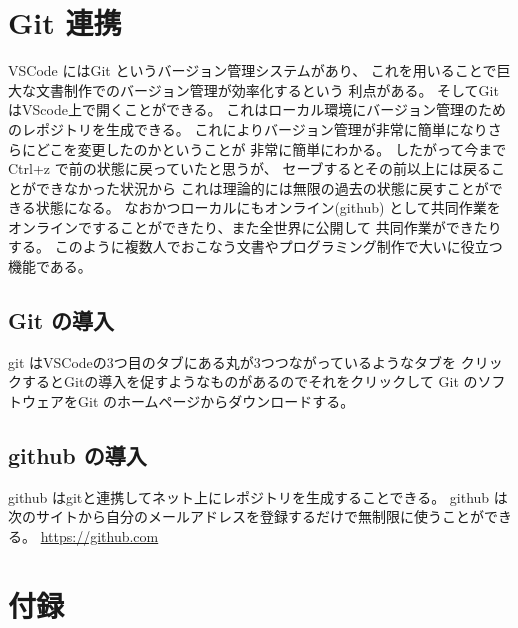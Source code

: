 \documentclass{ltjsarticle}
\begin{document}
\section{Git 連携}
VSCode にはGit というバージョン管理システムがあり、
これを用いることで巨大な文書制作でのバージョン管理が効率化するという
利点がある。
そしてGit はVScode上で開くことができる。
これはローカル環境にバージョン管理のためのレポジトリを生成できる。
これによりバージョン管理が非常に簡単になりさらにどこを変更したのかということが
非常に簡単にわかる。
したがって今までCtrl+z で前の状態に戻っていたと思うが、
セーブするとその前以上には戻ることができなかった状況から
これは理論的には無限の過去の状態に戻すことができる状態になる。
なおかつローカルにもオンライン(github)
として共同作業をオンラインですることができたり、また全世界に公開して
共同作業ができたりする。
このように複数人でおこなう文書やプログラミング制作で大いに役立つ機能である。
\subsection{Git の導入}
git はVSCodeの3つ目のタブにある丸が3つつながっているようなタブを
クリックするとGitの導入を促すようなものがあるのでそれをクリックして
Git のソフトウェアをGit のホームページからダウンロードする。
\subsection{github の導入}
github はgitと連携してネット上にレポジトリを生成することできる。
github は次のサイトから自分のメールアドレスを登録するだけで無制限に使うことができる。
\url{https://github.com}

\section{付録}
\end{document}
